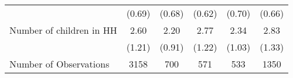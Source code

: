 \begin{tabular}{llllll}
\multicolumn{1}{l}{} &
  \multicolumn{1}{c}{(0.69)} &
  \multicolumn{1}{c}{(0.68)} &
  \multicolumn{1}{c}{(0.62)} &
  \multicolumn{1}{c}{(0.70)} &
  \multicolumn{1}{c}{(0.66)} \\
\multicolumn{1}{l}{Number of children in HH} &
  \multicolumn{1}{c}{2.60} &
  \multicolumn{1}{c}{2.20} &
  \multicolumn{1}{c}{2.77} &
  \multicolumn{1}{c}{2.34} &
  \multicolumn{1}{c}{2.83} \\
\multicolumn{1}{l}{} &
  \multicolumn{1}{c}{(1.21)} &
  \multicolumn{1}{c}{(0.91)} &
  \multicolumn{1}{c}{(1.22)} &
  \multicolumn{1}{c}{(1.03)} &
  \multicolumn{1}{c}{(1.33)} \\
\multicolumn{1}{l}{Number of Observations} &
  \multicolumn{1}{c}{3158} &
  \multicolumn{1}{c}{700} &
  \multicolumn{1}{c}{571} &
  \multicolumn{1}{c}{533} &
  \multicolumn{1}{c}{1350} \\
\cline{1-6}
\end{tabular}
